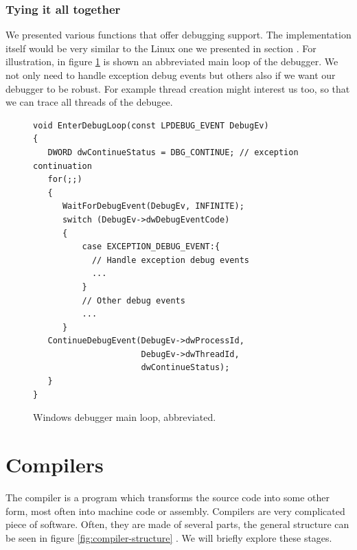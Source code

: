 \subsubsection*{Tying it all together}
We presented various functions that offer debugging support. The implementation
itself would be very similar to the Linux one we presented in section
. For illustration, in figure \ref{fig:windows-debugger-mainloop} is
shown an abbreviated main loop of the debugger. We not only need to handle
exception debug events but others also if we want our debugger to be robust.
For example thread creation might interest us too, so that we can trace all
threads of the debugee.

\begin{figure}
    \begin{verbatim}
void EnterDebugLoop(const LPDEBUG_EVENT DebugEv)
{
   DWORD dwContinueStatus = DBG_CONTINUE; // exception continuation
   for(;;)
   {
      WaitForDebugEvent(DebugEv, INFINITE);
      switch (DebugEv->dwDebugEventCode)
      {
          case EXCEPTION_DEBUG_EVENT:{
            // Handle exception debug events
            ...
          }
          // Other debug events
          ...
      }
   ContinueDebugEvent(DebugEv->dwProcessId,
                      DebugEv->dwThreadId,
                      dwContinueStatus);
   }
}
\end{verbatim}
\caption{Windows debugger main loop, abbreviated. }
\label{fig:windows-debugger-mainloop}
\end{figure}

\section{Compilers}
The compiler is a program which transforms the source code into some other
form, most often into machine code or assembly. Compilers are very complicated
piece of software. Often, they are made of several parts, the general structure
can be seen in figure \ref{fig:compiler-structure} \cite{dragon-book}. We will
briefly explore these stages.

